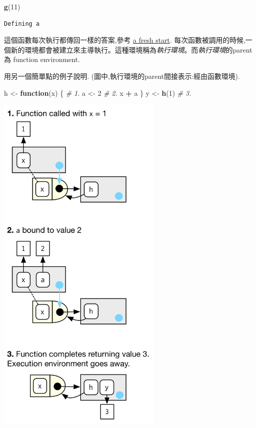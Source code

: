\documentclass[]{book}
\newenvironment{Shaded}{\begin{snugshade}}{\end{snugshade}}
\newcommand{\CommentTok}[1]{\textcolor[rgb]{0.56,0.35,0.01}{\textit{#1}}}
\newcommand{\ControlFlowTok}[1]{\textcolor[rgb]{0.13,0.29,0.53}{\textbf{#1}}}
\newcommand{\DecValTok}[1]{\textcolor[rgb]{0.00,0.00,0.81}{#1}}
\newcommand{\KeywordTok}[1]{\textcolor[rgb]{0.13,0.29,0.53}{\textbf{#1}}}
\newcommand{\NormalTok}[1]{#1}
\newcommand{\OperatorTok}[1]{\textcolor[rgb]{0.81,0.36,0.00}{\textbf{#1}}}
\newcommand{\StringTok}[1]{\textcolor[rgb]{0.31,0.60,0.02}{#1}}
\theoremstyle{definition}
\theoremstyle{definition}
\theoremstyle{definition}
\theoremstyle{remark}
\begin{document}
\begin{Shaded}
\begin{Highlighting}[]
\KeywordTok{g}\NormalTok{(}\DecValTok{11}\NormalTok{)}
\end{Highlighting}
\end{Shaded}

\begin{verbatim}
Defining a
\end{verbatim}

這個函數每次執行都傳回一樣的答案,參考 \protect\hyperlink{fresh-start}{a
fresh start}.
每次函數被調用的時候,一個新的環境都會被建立來主導執行。這種環境稱為\emph{執行環境}。而\emph{執行環境}的parent為
function environment.

用另一個簡單點的例子說明. (圖中,執行環境的parent間接表示:經由函數環境).

\begin{Shaded}
\begin{Highlighting}[]
\NormalTok{h <-}\StringTok{ }\ControlFlowTok{function}\NormalTok{(x) \{}
  \CommentTok{# 1.}
\NormalTok{  a <-}\StringTok{ }\DecValTok{2} \CommentTok{# 2.}
\NormalTok{  x }\OperatorTok{+}\StringTok{ }\NormalTok{a}
\NormalTok{\}}
\NormalTok{y <-}\StringTok{ }\KeywordTok{h}\NormalTok{(}\DecValTok{1}\NormalTok{) }\CommentTok{# 3.}
\end{Highlighting}
\end{Shaded}

\begin{center}\includegraphics[width=3.15in]{diagrams/environments/execution} \end{center}
\end{document}

